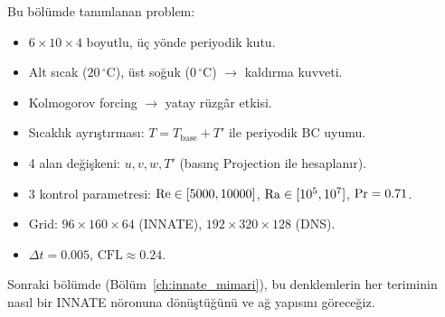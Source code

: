 Bu bölümde tanımlanan problem:

\begin{itemize}
    \item $6 \times 10 \times 4$ boyutlu, üç yönde periyodik kutu.
    \item Alt sıcak ($20\,^{\circ}\mathrm{C}$), üst soğuk ($0\,^{\circ}\mathrm{C}$) $\to$ kaldırma kuvveti.
    \item Kolmogorov forcing $\to$ yatay rüzgâr etkisi.
    \item Sıcaklık ayrıştırması: $T = T_{\text{base}} + T'$ ile periyodik BC uyumu.
    \item 4 alan değişkeni: $u, v, w, T'$ (basınç Projection ile hesaplanır).
    \item 3 kontrol parametresi: $\mathrm{Re} \in [5000, 10000]$, $\mathrm{Ra} \in [10^5, 10^7]$, $\mathrm{Pr} = 0.71$.
    \item Grid: $96 \times 160 \times 64$ (INNATE), $192 \times 320 \times 128$ (DNS).
    \item $\Delta t = 0.005$, $\mathrm{CFL} \approx 0.24$.
\end{itemize}

Sonraki bölümde (Bölüm~\ref{ch:innate_mimari}), bu denklemlerin her teriminin nasıl bir INNATE nöronuna dönüştüğünü ve ağ yapısını göreceğiz.
